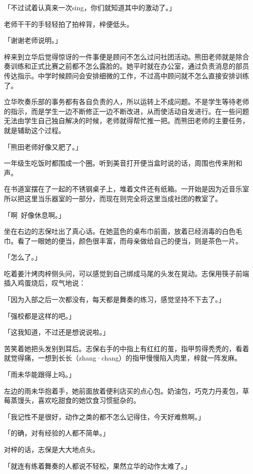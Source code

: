 \documentclass[UTF8]{ctexart}
\begin{document}
    「不过试着认真来一次sing，你们就知道其中的激动了。」

    老师干干的手轻轻拍了拍梓背，梓便低头。

    「谢谢老师说明。」

    梓来到立华后觉得惊讶的一件事便是顾问不怎么过问社团活动。熊田老师就是除合奏训练和正式比赛之前都不怎么露脸的。她平时就在办公室，通过负责消息的部员传达指示。中学时候顾问会安排细微的工作，不过高中顾问就不怎么直接安排训练了。

    立华吹奏乐部的事务都有各自负责的人，所以运转上不成问题。不是学生等待老师的指示，而是学生一边不断修正一边不断改进，从而使活动自发进行。在一些问题无法由学生自己独自解决的时候，老师就得帮忙推一把。而熊田老师的主要任务，就是辅助这个过程。

    「熊田老师好像又肥了。」

    一年级生吃饭时都围成一个圈。听到美音打开便当盒时说的话，周围也传来附和声。

    在书道室摆在了一起的不锈钢桌子上，堆着文件还有纸箱。一开始是因为近音乐室所以把这里当乐器室的一部分，而现在则完全将这里当成社团的教室了。

    「啊~好像休息啊。」

    坐在右边的志保吐出了真心话。在她蓝色的桌布巾前面，放着已经消毒的白色毛巾。看了一眼她的便当，颜色很丰富，而母亲做给自己的便当，则是茶色一片。

    「怎么了。」

    吃着姜汁烤肉梓侧头问，可以感觉到自己绑成马尾的头发在晃动。志保用筷子前端插入鸡蛋烧后，叹气地说：

    「因为入部之后一次都没有，每天都是舞奏的练习，感觉坚持不下去了。」

    「强校都是这样的吧。」

    「这我知道，不过还是想说说啦。」

    苦笑着她把头发别到耳后。志保右手的中指上有红红的茧，指甲剪得秃秃的，看着就觉得痛，一想到长长（zhang·chang）的指甲慢慢陷入肉里，梓就一阵发麻。

    「雨未华能跟得上吗。」

    左边的雨未华抱着手，她前面放着便利店买的点心包。奶油包，巧克力丹麦包，草莓蒸馒头，喜欢吃甜食的她饮食习惯挺杂的。

    「我记性不是很好，动作之类的都不怎么记得住，今天好难熬啊。」

    「的确，对有经验的人都不简单。」

    对梓的话，志保是大大地点头。

    「就连有练着舞奏的人都说不轻松，果然立华的动作太难了。」
\end{document}

